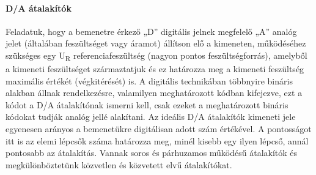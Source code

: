\paragraph{D/A átalakítók}
Feladatuk, hogy a bemenetre érkező „D” digitális jelnek megfelelő „A” analóg jelet (általában feszültséget vagy áramot) állítson elő a kimeneten, működéséhez szükséges egy U\textsubscript{R} referenciafeszültség (nagyon pontos feszültségforrás), amelyből a kimeneti feszültséget származtatjuk és ez határozza meg a kimeneti feszültség maximális értékét (végkitérését) is. A digitális technikában többnyire bináris alakban állnak rendelkezésre, valamilyen meghatározott kódban kifejezve, ezt a kódot a D/A átalakítónak ismerni kell, csak ezeket a meghatározott bináris kódokat tudják analóg jellé alakítani. Az ideális D/A átalakítók kimeneti jele egyenesen arányos a bemenetükre digitálisan adott szám értékével. A pontosságot itt is az elemi lépcsők száma határozza meg, minél kisebb egy ilyen lépcső, annál pontosabb az átalakítás. Vannak soros és párhuzamos működésű átalakítók és megkülönböztetünk közvetlen és közvetett elvű átalakítókat.